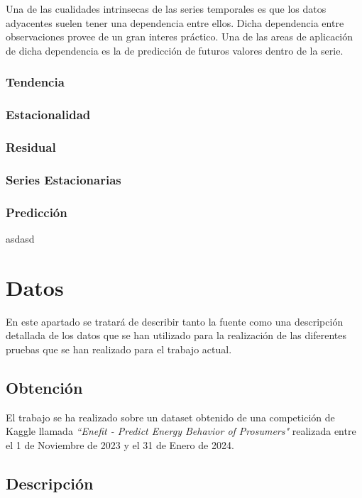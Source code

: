 \documentclass[a4paper,12pt]{article}
\begin{document}
Una de las cualidades intrinsecas de las series temporales es 
que los datos adyacentes suelen tener una dependencia entre 
ellos. Dicha dependencia entre observaciones provee de un 
gran interes práctico. Una de las areas de aplicación de 
dicha dependencia es la de predicción de futuros valores dentro 
de la serie.

\subsubsection{Tendencia}

\subsubsection{Estacionalidad}

\subsubsection{Residual}

\subsubsection{Series Estacionarias}

\subsubsection{Predicción}

asdasd

\section{Datos}

En este apartado se tratará de describir tanto la fuente como 
una descripción detallada de los datos que se han utilizado
para la realización de las diferentes pruebas que se han 
realizado para el trabajo actual.

\subsection{Obtención}

El trabajo se ha realizado sobre un dataset obtenido de 
una competición de Kaggle llamada 
\textit{``Enefit - Predict Energy Behavior of Prosumers"}
realizada entre el 1 de Noviembre de 2023 y el 31 de 
Enero de 2024.

\subsection{Descripción}
\end{document}
